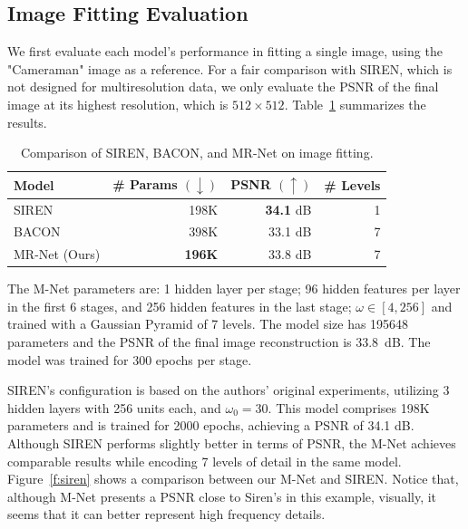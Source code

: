 \subsection{Image Fitting Evaluation}

We first evaluate each model's performance in fitting a single image, using the "Cameraman" image as a reference. For a fair comparison with SIREN, which is not designed for multiresolution data, we only evaluate the PSNR of the final image at its highest resolution, which is $512 \times 512$. Table~\ref{t:comp} summarizes the results.

\begin{table}[!h]
\centering
\small
\begin{tabular}{|l|r|r|r|}
\hline
Model & \# Params $(\downarrow)$ & PSNR $(\uparrow)$ & \# Levels \\
\hline
SIREN~\citep{sitzmann2019siren} & 198K & {\bf 34.1} dB & 1  \\
BACON~\citep{bacon2021} & 398K & 33.1 dB & 7 \\
MR-Net (Ours) & {\bf 196K} & 33.8 dB & 7  \\
\hline
\end{tabular}
\caption{Comparison of SIREN, BACON, and MR-Net on image fitting.}
\label{t:comp}
\end{table}

The M-Net parameters are: 1 hidden layer per stage; 96 hidden features per layer in the first 6 stages, and 256 hidden features in the last stage; $\omega \in [4, 256]$ and trained with a Gaussian Pyramid of 7 levels. The model size has 195648 parameters and the PSNR of the final image reconstruction is 33.8~dB. The model was trained for 300 epochs per stage.

SIREN's configuration is based on the authors' original experiments, utilizing 3 hidden layers with 256 units each, and $\omega_0 = 30$. This model comprises 198K parameters and is trained for 2000 epochs, achieving a PSNR of 34.1 dB. Although SIREN performs slightly better in terms of PSNR, the M-Net achieves comparable results while encoding 7 levels of detail in the same model. Figure~\ref{f:siren} shows a comparison between our M-Net and SIREN. Notice that, although M-Net presents a PSNR close to Siren's in this example, visually, it seems that it can better represent high frequency details.

